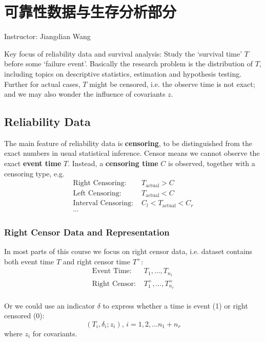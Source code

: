 \section{可靠性数据与生存分析部分}\label{SecReliabilityAndSurvivalAnalysis}
\begin{center}
    Instructor: Jiangdian Wang 
\end{center}

Key focus of reliability data and survival analysis: Study the `survival time' $ T $ before some `failure event'. Basically the research problem is the distribution of $ T $, including topics on descriptive statistics, estimation and hypothesis testing. Further for actual cases, $ T $ might be censored, i.e. the observe time is not exact; and we may also wonder the influence of covariants $ z $.

\subsection{Reliability Data}
The main feature of reliability data is \textbf{censoring}, to be distinguished from the exact numbers in usual statistical inference. Censor means we cannot observe the exact \textbf{event time} $ T $. Instead, a \textbf{censoring time} $ C $ is observed, together with a censoring type, e.g. 
\begin{align}
    \text{Right Censoring: }&T_\mathrm{actual}>C \\
    \text{Left Censoring: }&T_{\mathrm{actual} }<C\\
    \text{Interval Censoring: }&C_l<T_{\mathrm{actual} }<C_r\\
    \cdots&
\end{align} 

\subsubsection{Right Censor Data and Representation}
In most parts of this course we focus on right censor data, i.e. dataset contains both event time $ T $ and right censor time $ T^+ $:
\begin{align}
    \text{Event Time: }&T_1,\ldots,T_{n_1}\\
    \text{Right Censor: }&T^+_{1},\ldots ,T^+_{n_r}\\
\end{align}

Or we could use an indicator $ \delta  $ to express whether a time is event (1) or right censored (0):
\begin{equation}
    (T_i,\delta _i;z_i),\, i=1,2,\ldots n_1+n_r 
\end{equation}
where $ z_i $ for covariants.

